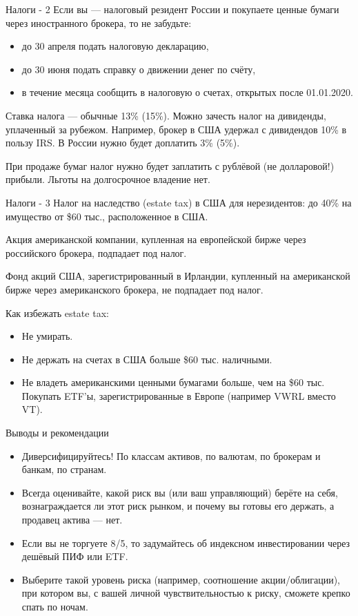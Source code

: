 \documentclass{beamer}
\begin{document}
\begin{frame}{Налоги - 2}
\justify
Если вы --- налоговый резидент России и покупаете ценные бумаги через иностранного брокера, то не забудьте:
\begin{itemize}
\justifying
\item до 30 апреля подать налоговую декларацию,
\item до 30 июня подать справку о движении денег по счёту,
\item в течение месяца сообщить в налоговую о счетах, открытых после 01.01.2020. 
\end{itemize}

\justify
Ставка налога --- обычные 13\% (15\%). Можно зачесть налог на дивиденды, уплаченный за рубежом. Например, брокер в США удержал с дивидендов 10\% в пользу IRS. В России нужно будет доплатить 3\% (5\%).

\justify
При продаже бумаг налог нужно будет заплатить с рублёвой (не долларовой!) прибыли. Льготы на долгосрочное владение нет. 
\end{frame}



\begin{frame}{Налоги - 3}
\justify
Налог на наследство (estate tax) в США для нерезидентов: до 40\% на имущество от \$60 тыс., расположенное в США.

\justify
Акция американской компании, купленная на европейской бирже через российского брокера, подпадает под налог.

\justify
Фонд акций США, зарегистрированный в Ирландии, купленный на американской бирже через американского брокера, не подпадает под налог.

\justify
Как избежать estate tax:
\begin{itemize}
\justifying
\item Не умирать.
\item Не держать на счетах в США больше \$60 тыс. наличными.
\item Не владеть американскими ценными бумагами больше, чем на \$60 тыс. Покупать ETF'ы, зарегистрированные в Европе (например VWRL вместо VT).
\end{itemize}
\end{frame}



\begin{frame}{Выводы и рекомендации}
\begin{itemize}
\justifying
\item Диверсифицируйтесь! По классам активов, по валютам, по брокерам и банкам, по странам.
\item Всегда оценивайте, какой риск вы (или ваш управляющий) берёте на себя, вознаграждается ли этот риск рынком, и почему вы готовы его держать, а продавец актива --- нет.
\item Если вы не торгуете 8/5, то задумайтесь об индексном инвестировании через дешёвый ПИФ или ETF.
\item Выберите такой уровень риска (например, соотношение акции/облигации), при котором вы, с вашей личной чувствительностью к риску, сможете крепко спать по ночам.
\end{itemize}
\end{frame}
\end{document}
